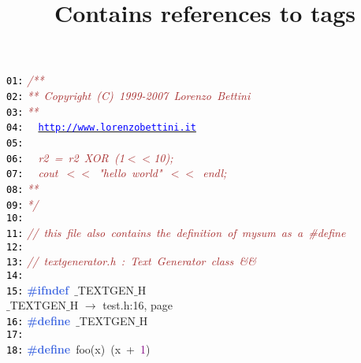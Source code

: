 \documentclass{article}
\title{Contains references to tags}
\date{}
\begin{document}
\maketitle
\noindent
\mbox{}\texttt{\textcolor{Black}{01:}} \textit{\textcolor{Brown}{/**}} \\
\mbox{}\texttt{\textcolor{Black}{02:}} \textit{\textcolor{Brown}{**\ Copyright\ (C)\ 1999-2007\ Lorenzo\ Bettini}} \\
\mbox{}\texttt{\textcolor{Black}{03:}} \textit{\textcolor{Brown}{**\ \ }} \\
\mbox{}\texttt{\textcolor{Black}{04:}} \textit{\textcolor{Brown}{\ \ }}\underline{\texttt{\textcolor{Blue}{http://www.lorenzobettini.it}}} \\
\mbox{}\texttt{\textcolor{Black}{05:}} \textit{\textcolor{Brown}{\ \ }} \\
\mbox{}\texttt{\textcolor{Black}{06:}} \textit{\textcolor{Brown}{\ \ r2\ =\ r2\ XOR\ (1$<$$<$10);}} \\
\mbox{}\texttt{\textcolor{Black}{07:}} \textit{\textcolor{Brown}{\ \ cout\ $<$$<$\ "{}hello\ world"{}\ $<$$<$\ endl;}} \\
\mbox{}\texttt{\textcolor{Black}{08:}} \textit{\textcolor{Brown}{**\ \ }} \\
\mbox{}\texttt{\textcolor{Black}{09:}} \textit{\textcolor{Brown}{*/}} \\
\mbox{}\texttt{\textcolor{Black}{10:}}  \\
\mbox{}\texttt{\textcolor{Black}{11:}} \textit{\textcolor{Brown}{//\ this\ file\ also\ contains\ the\ definition\ of\ mysum\ as\ a\ \#define}} \\
\mbox{}\texttt{\textcolor{Black}{12:}}  \\
\mbox{}\texttt{\textcolor{Black}{13:}} \textit{\textcolor{Brown}{//\ textgenerator.h\ :\ Text\ Generator\ class\ \&\&}} \\
\mbox{}\texttt{\textcolor{Black}{14:}}  \\
\mbox{}\texttt{\textcolor{Black}{15:}} \textbf{\textcolor{RoyalBlue}{\#ifndef}}\ $\_$TEXTGEN$\_$H \\
\mbox{}{\hfill $\_$TEXTGEN$\_$H $\rightarrow$ test.h:16, page~\pageref{test.h:16}} \\
\mbox{}\texttt{\textcolor{Black}{16:}} \textbf{\textcolor{RoyalBlue}{\#define}}\ \label{test.h:16}$\_$TEXTGEN$\_$H \\
\mbox{}\texttt{\textcolor{Black}{17:}}  \\
\mbox{}\texttt{\textcolor{Black}{18:}} \textbf{\textcolor{RoyalBlue}{\#define}}\ \label{test.h:18}foo\textcolor{BrickRed}{(}x\textcolor{BrickRed}{)}\ \textcolor{BrickRed}{(}x\ \textcolor{BrickRed}{+}\ \textcolor{Purple}{1}\textcolor{BrickRed}{)} \\
\end{document}
